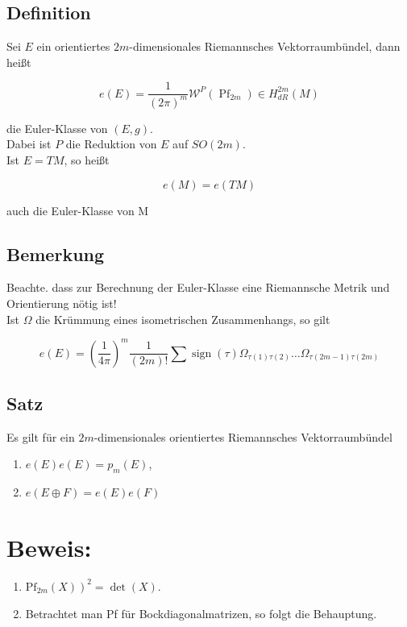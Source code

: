 \documentclass[10pt, letterpaper]{article}
\begin{document}
\subsection*{Definition}
Sei $E$ ein orientiertes $2 m$-dimensionales Riemannsches Vektorraumbündel, dann heißt

$$
e(E)=\frac{1}{(2 \pi)^{m}} \mathcal{W}^{P}\left(\operatorname{Pf}_{2 m}\right) \in H_{d R}^{2 m}(M)
$$

die Euler-Klasse von $(E, g)$.\\
Dabei ist $P$ die Reduktion von $E$ auf $S O(2 m)$.\\
Ist $E=T M$, so heißt

$$
e(M)=e(T M)
$$

auch die Euler-Klasse von M

\subsection*{Bemerkung}
Beachte. dass zur Berechnung der Euler-Klasse eine Riemannsche Metrik und Orientierung nötig ist!\\
Ist $\Omega$ die Krümmung eines isometrischen Zusammenhangs, so gilt

$$
e(E)=\left(\frac{1}{4 \pi}\right)^{m} \frac{1}{(2 m)!} \sum \operatorname{sign}(\tau) \Omega_{\tau(1) \tau(2)} \ldots \Omega_{\tau(2 m-1) \tau(2 m)}
$$

\subsection*{Satz}
Es gilt für ein $2 m$-dimensionales orientiertes Riemannsches Vektorraumbündel

\begin{enumerate}
  \item $e(E) e(E)=p_{m}(E)$,
  \item $e(E \oplus F)=e(E) e(F)$
\end{enumerate}

\section*{Beweis:}
\begin{enumerate}
  \item $\left.\mathrm{Pf}_{2 m}(X)\right)^{2}=\operatorname{det}(X)$.
  \item Betrachtet man Pf für Bockdiagonalmatrizen, so folgt die Behauptung.
\end{enumerate}
\end{document}
